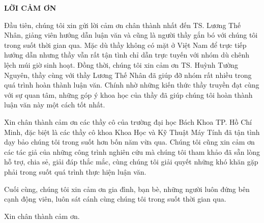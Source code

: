 \begin{titlepage}
\centering
	{\scshape\LARGE \textbf{LỜI CẢM ƠN} \par}
	\vspace{1cm}
	
\justify
Đầu tiên, chúng tôi xin gửi lời cảm ơn chân thành nhất đến TS. Lương Thế Nhân, giảng viên
hướng dẫn luận văn và cũng là người thầy gắn bó với chúng tôi trong suốt thời gian qua. Mặc dù thầy không có mặt ở Việt Nam để trực tiếp hướng dẫn nhưng thầy vẫn rất tận tình chỉ dẫn trực tuyến với nhóm dù chênh lệch múi giờ sinh hoạt. Đồng thời, chúng tôi xin cảm ơn TS. Huỳnh Tường Nguyên, thầy cùng với thầy Lương Thế Nhân đã giúp đỡ nhóm rất nhiều trong quá trình hoàn thành luận văn. Chính nhờ những kiến thức thầy truyền đạt cùng với sự quan tâm, những góp ý khoa học của thầy đã giúp chúng tôi hoàn thành luận văn
này một cách tốt nhất.  \par
Xin chân thành cảm ơn các thầy cô của trường đại học Bách Khoa TP. Hồ Chí Minh, đặc biệt
là các thầy cô khoa Khoa Học và Kỹ Thuật Máy Tính đã tận tình dạy bảo chúng tôi trong suốt
hơn bốn năm vừa qua. Chúng tôi cũng xin cảm ơn các tác giả của những công trình nghiên cứu mà chúng tôi tham khảo đã sẵn lòng hỗ trợ, chia sẻ, giải đáp thắc mắc, cùng chúng
tôi giải quyết những khó khăn gặp phải trong suốt quá trình thực hiện luận văn.\par
Cuối cùng, chúng tôi xin cảm ơn gia đình, bạn bè, những người luôn đứng bên cạnh động
viên, luôn sát cánh cùng chúng tôi trong suốt thời gian qua.\par
Xin chân thành cảm ơn. \par


\vfill %
\end{titlepage}